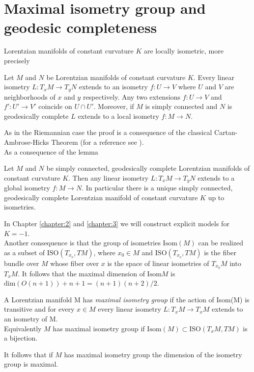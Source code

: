 \section{Maximal isometry group and geodesic completeness}
Lorentzian manifolds of constant curvature $K$ are locally isometric, more precisely
\begin{lemma}
    Let $M$ and $N$ be Lorentzian manifolds of constant curvature $K$. Every linear isometry $L: T_x M \to T_y N$ extends to an isometry $f: U \to V$ where $U$ and $V$ are neighborhoods of $x$ and $y$ respectively. Any two extensions $f:U\to V$ and $f' : U' \to V'$ coincide on $U \cap U'$. Moreover, if $M$ is simply connected and $N$ is geodesically complete $L$ extends to a local isometry $f:M\to N$.
\end{lemma}
As in the Riemannian case the proof is a consequence of the classical Cartan-Ambrose-Hicks Theorem (for a reference see \cite{piccione2005single}).\\
As a consequence of the lemma
\begin{corollary}
    Let $M$ and $N$ be simply connected, geodesically complete Lorentzian manifolds of constant curvature $K$. Then any linear isometry $L: T_x M \to T_y N$ extends to a global isometry $f: M \to N$. In particular there is a unique simply connected, geodesically complete Lorentzian manifold of constant curvature $K$ up to isometries.
\end{corollary}
\noindent In Chapter \ref{chapter:2} and \ref{chapter:3} we will construct explicit models for $K=-1$.\\
Another consequence is that the group of isometries $\text{Isom}(M)$ can be realized as a subset of $\text{ISO}(T_{x_o}, TM)$, where $x_0 \in M$ and $\text{ISO}(T_{x_o}, TM)$ is the fiber bundle over $M$ whose fiber over $x$ is the space of linear isometries of $T_{x_0}M$ into $T_xM$.
It follows that the maximal dimension of $\text{Isom}M$ is $\text{dim}(O(n+1)) + n +1 = (n+1)(n+2)/2$.\\
\begin{definition}
    A Lorentzian manifold M has \textit{maximal isometry group} if the action of Isom(M) is transitive and for every $x\in M$ every linear isometry $L: T_xM \to T_xM$ extends to an isometry of M.\\
    Equivalently $M$ has maximal isometry group if $\text{Isom}(M) \subset \text{ISO}(T_xM, TM)$ is a bijection.
\end{definition}
It follows that if $M$ has maximal isometry group the dimension of the isometry group is maximal.\\
